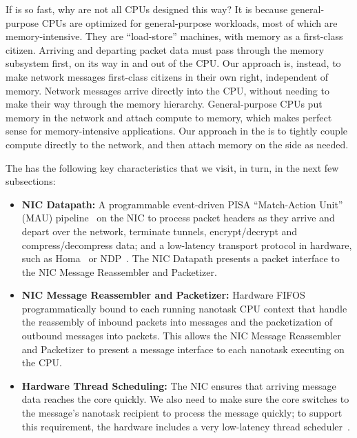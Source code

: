 If \name{} is so fast, why are not all CPUs designed this way? 
It is because general-purpose CPUs are optimized for general-purpose workloads, most of which are memory-intensive. 
They are ``load-store'' machines, with memory as a first-class citizen. 
Arriving and departing packet data must pass through the memory subsystem first, on its way in and out of the CPU. 
Our approach is, instead, to make network messages first-class citizens in their own right, independent of memory. 
Network messages arrive directly into the CPU, without needing to make their way through the memory hierarchy. 
General-purpose CPUs put memory in the network and attach compute to memory, which makes perfect sense for memory-intensive applications. 
Our approach in the \name{} is to tightly couple compute directly to the network, and then attach memory on the side as needed.

The \name{} has the following key characteristics that we visit, in turn, in the next few subsections: 
\begin{itemize}
    \item {\bf NIC Datapath:} A programmable event-driven PISA ``Match-Action Unit'' (MAU) pipeline~\cite{event-driven-pisa} on the NIC to process packet headers as they arrive and depart over the network, terminate tunnels, encrypt/decrypt and compress/decompress data; and a low-latency transport protocol in hardware, such as Homa~\cite{homa} or NDP~\cite{ndp}. The NIC Datapath presents a packet interface to the NIC Message Reassembler and Packetizer.
    
    \item {\bf NIC Message Reassembler and Packetizer:} Hardware FIFOS programmatically bound to each running nanotask CPU context that handle the reassembly of inbound packets into messages and the packetization of outbound messages into packets. This allows the NIC Message Reassembler and Packetizer to present a message interface to each nanotask executing on the CPU.
    
    \item {\bf Hardware Thread Scheduling:} The NIC ensures that arriving message data reaches the core quickly. We also need to make sure the core switches to the message's nanotask recipient to process the message quickly; to support this requirement, the hardware includes a very low-latency thread scheduler~\cite{resq}.
\end{itemize}

